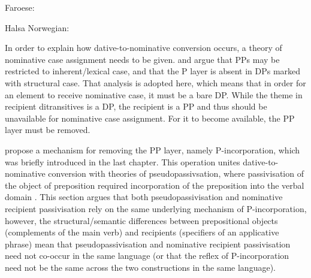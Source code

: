 \begin{exe}
	\ex Faroese:\label{ex:far-pass}
	\begin{xlist}
	\end{xlist}
	\ex Halsa Norwegian:\label{ex:halsa-pass}
	\begin{xlist}
	\end{xlist}
\end{exe}

In order to explain how dative-to-nominative conversion occurs, a theory of nominative case assignment needs to be given. \cite{Bayer.2001} and \cite{Asbury.2005,Asbury.2007} argue that PPs may be restricted to inherent/lexical case, and that the P layer is absent in DPs marked with structural case. That analysis is adopted here, which means that in order for an element to receive nominative case, it must be a bare DP. While the theme in recipient ditransitives is a DP, the recipient is a PP and thus should be unavailable for nominative case assignment. For it to become available, the PP layer must be removed.

\cite{Alexiadou.2015} propose a mechanism for removing the PP layer, namely P-incorporation, which was briefly introduced in the last chapter. This operation unites dative-to-nominative conversion with theories of pseudopassivsation, where passivisation of the object of preposition required incorporation of the preposition into the verbal domain \citep{Herslund.1984}. This section argues that both pseudopassivisation and nominative recipient passivisation rely on the same underlying mechanism of P-incorporation, however, the structural/semantic differences between prepositional objects (complements of the main verb) and recipients (specifiers of an applicative phrase) mean that pseudopassivisation and nominative recipient passivisation need not co-occur in the same language (or that the reflex of P-incorporation need not be the same across the two constructions in the same language).

